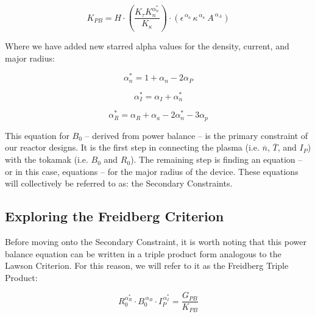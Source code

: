 \begin{equation}
	K_{PB} = H \cdot \left( \frac{ K_\tau K_n^{\alpha_n^*}}{K_\kappa } \right) \cdot \left( 
     \epsilon^{\,\alpha_a} \, \kappa^{\,\alpha_\kappa} \, A^{\,\alpha_A}\right)
\end{equation}

Where we have added new starred alpha values for the density, current, and major radius:

\begin{equation}
  \alpha_n^* = 1 + \alpha_n - 2 \alpha_P
\end{equation}

\begin{equation}
  \alpha_I^* = \alpha_I + \alpha_n^*
\end{equation}

\begin{equation}
  \alpha_R^* = \alpha_R + \alpha_a - 2  \alpha_n^* - 3 \alpha_p
\end{equation}

This equation for $B_0$ -- derived from power balance -- is the primary constraint of our reactor designs. It is the first step in connecting the plasma (i.e. $\overline n$, $\overline T$, and $I_P$) with the tokamak (i.e. $B_0$ and $R_0$). The remaining step is finding an equation -- or in this case, equations -- for the major radius of the device. These equations will collectively be referred to as: the Secondary Constraints. 

\subsection{Exploring the Freidberg Criterion}

Before moving onto the Secondary Constraint, it is worth noting that this power balance equation can be written in a triple product form analogous to the Lawson Criterion. For this reason, we will refer to it as the Freidberg Triple Product:

\begin{equation}
	R_0^{ \alpha_R^* } \cdot B_0^{\,\alpha_B} \cdot I_P^{\,\alpha_I^*} = \frac{ G_{PB} }{ K_{PB} }
\end{equation}

